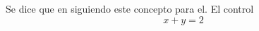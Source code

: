 \documentclass[11pt,a4paper]{book}
\begin{document}
 Se dice que  en \cite{khalil:2002} siguiendo este concepto para el. El control
\begin{equation}
    x+y=2
\end{equation}


\end{document}
